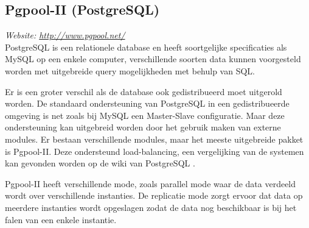 \subsection{Pgpool-II (PostgreSQL)}
\textit{Website: \url{http://www.pgpool.net/}}\\
PostgreSQL is een relationele database en heeft soortgelijke specificaties als MySQL op een enkele computer, verschillende soorten data kunnen voorgesteld worden met uitgebreide query mogelijkheden met behulp van SQL. 

Er is een groter verschil als de database ook gedistribueerd moet uitgerold worden. De standaard ondersteuning van PostgreSQL in een gedistribueerde omgeving is net zoals bij MySQL een Master-Slave configuratie. Maar deze ondersteuning kan uitgebreid worden door het gebruik maken van externe modules. Er bestaan verschillende modules, maar het meeste uitgebreide pakket is Pgpool-II. Deze ondersteund load-balancing, een vergelijking van de systemen kan gevonden worden op de wiki van PostgreSQL \cite{postgresql-clustering}. 

Pgpool-II heeft verschillende mode, zoals parallel mode waar de data verdeeld wordt over verschillende instanties. De replicatie mode zorgt ervoor dat data op meerdere instanties wordt opgeslagen zodat de data nog beschikbaar is bij het falen van een enkele instantie.